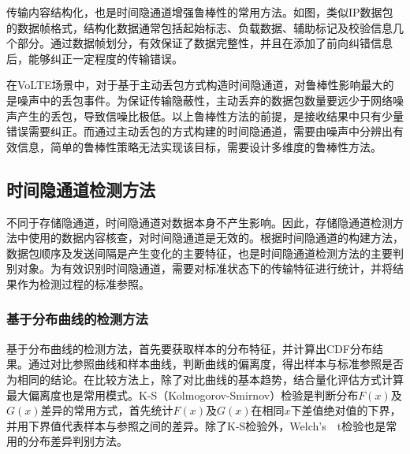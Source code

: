 
传输内容结构化，也是时间隐通道增强鲁棒性的常用方法。如图，类似IP数据包的数据帧格式，结构化数据通常包括起始标志、负载数据、辅助标记及校验信息几个部分。通过数据帧划分，有效保证了数据完整性，并且在添加了前向纠错信息后，能够纠正一定程度的传输错误。

在VoLTE场景中，对于基于主动丢包方式构造时间隐通道，对鲁棒性影响最大的是噪声中的丢包事件。为保证传输隐蔽性，主动丢弃的数据包数量要远少于网络噪声产生的丢包，导致信噪比极低。以上鲁棒性方法的前提，是接收结果中只有少量错误需要纠正。而通过主动丢包的方式构建的时间隐通道，需要由噪声中分辨出有效信息，简单的鲁棒性策略无法实现该目标，需要设计多维度的鲁棒性方法。

\subsection{时间隐通道检测方法}
\label{sec:intro:background:detect}

不同于存储隐通道，时间隐通道对数据本身不产生影响。因此，存储隐通道检测方法中使用的数据内容核查，对时间隐通道是无效的。根据时间隐通道的构建方法，数据包顺序及发送间隔是产生变化的主要特征，也是时间隐通道检测方法的主要判别对象。为有效识别时间隐通道，需要对标准状态下的传输特征进行统计，并将结果作为检测过程的标准参照。

\subsubsection{基于分布曲线的检测方法}
基于分布曲线的检测方法，首先要获取样本的分布特征，并计算出CDF分布结果。通过对比参照曲线和样本曲线，判断曲线的偏离度，得出样本与标准参照是否为相同的结论。在比较方法上，除了对比曲线的基本趋势，结合量化评估方式计算最大偏离度也是常用模式。K-S（Kolmogorov-Smirnov）检验是判断分布$F(x)$及$G(x)$差异的常用方式，首先统计$F(x)$及$G(x)$在相同$x$下差值绝对值的下界，并用下界值代表样本与参照之间的差异。除了K-S检验外，{Welch's\ \ t检验}也是常用的分布差异判别方法。

